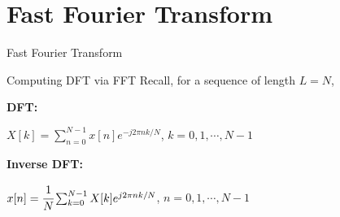 \documentclass[aspectratio=169,xcolor=dvipsnames,svgnames,x11names,fleqn]{beamer}
\begin{document}
\section{Fast Fourier Transform}


\begin{frame}{}
    \begin{center}
    \Huge \bf \color{DarkBlue}
    \faFire
    
    Fast Fourier Transform
\end{center}
\end{frame}

\begin{frame}{Computing DFT via FFT}
    Recall, for a sequence of length $L = N$, 
\begin{gradred}
      \textbf{DFT:}

        $X[k] =  \sum_{n=0}^{N-1} x[n] e^{-j2\pi n k /N}$, $ k = 0, 1, \cdots, N-1$

 \textbf{Inverse DFT:}

        $x[n] = \cfrac{1}{N}\sum_{k=0}^{N-1} X[k] e^{j2\pi n k /N}$,  $ n = 0, 1, \cdots, N-1$
\end{gradred}
      
    
\end{frame}
\end{document}
